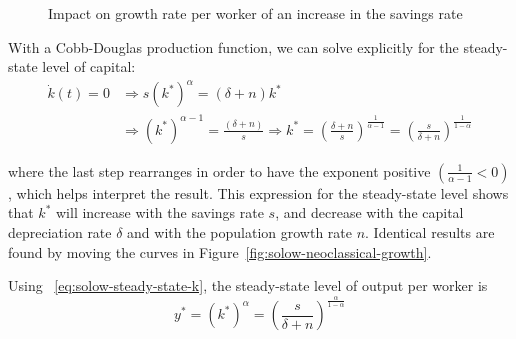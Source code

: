 \documentclass[\topdir/lecture\_notes.tex]{subfiles}
\begin{document}
\begin{figure}[h]
\begin{center}

  \caption{Impact on growth rate per worker of an increase in the savings rate}
  \label{fig:solow-savings-impact}
\end{center}
\end{figure}

With a Cobb-Douglas production function, we can solve explicitly for the steady-state level of capital:
\begin{equation}
\begin{aligned}
\dot{k}(t)=0 & \Longrightarrow s\left(k^{*}\right)^{\alpha}=(\delta+n) k^{*} \\
& \Longrightarrow\left(k^{*}\right)^{\alpha-1}=\frac{(\delta+n)}{s} \Longrightarrow k^{*}=\left(\frac{\delta+n}{s}\right)^{\frac{1}{\alpha-1}} =\left(\frac{s}{\delta+n}\right)^{\frac{1}{1-\alpha}}
\end{aligned}
\label{eq:solow-steady-state-k}
\end{equation}

where the last step rearranges in order to have the exponent positive \(\left(\frac{1}{\alpha-1}<0\right)\), which helps interpret the result. This expression for the steady-state level shows that \(k^{*}\) will increase with the savings rate \(s\), and decrease with the capital depreciation rate \(\delta\) and with the population growth rate \(n\). Identical results are found by moving the curves in Figure~\ref{fig:solow-neoclassical-growth}.

Using ~\ref{eq:solow-steady-state-k}, the steady-state level of output per worker is
\begin{equation}
y^{*}=\left(k^{*}\right)^{\alpha}=\left(\frac{s}{\delta+n}\right)^{\frac{\alpha}{1-\alpha}}
\label{eq:solow-steady-state-y}
\end{equation}
\end{document}
